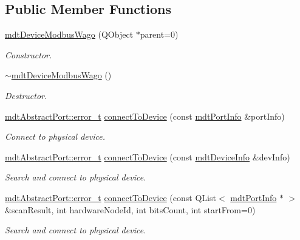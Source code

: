 \subsection*{Public Member Functions}
\begin{DoxyCompactItemize}
\item 
\hyperlink{classmdt_device_modbus_wago_a31abb03678a8afe2e6bf7c03e5e92726}{mdt\-Device\-Modbus\-Wago} (Q\-Object $\ast$parent=0)
\begin{DoxyCompactList}\small\item\em Constructor. \end{DoxyCompactList}\item 
\hyperlink{classmdt_device_modbus_wago_a8a13bfe3028d8c286d4233ea0ce0b2a8}{$\sim$mdt\-Device\-Modbus\-Wago} ()
\begin{DoxyCompactList}\small\item\em Destructor. \end{DoxyCompactList}\item 
\hyperlink{classmdt_abstract_port_ad4121bb930c95887e77f8bafa065a85e}{mdt\-Abstract\-Port\-::error\-\_\-t} \hyperlink{classmdt_device_modbus_wago_ac15c95cee8dec98609278d0e0ab2b3ce}{connect\-To\-Device} (const \hyperlink{classmdt_port_info}{mdt\-Port\-Info} \&port\-Info)
\begin{DoxyCompactList}\small\item\em Connect to physical device. \end{DoxyCompactList}\item 
\hyperlink{classmdt_abstract_port_ad4121bb930c95887e77f8bafa065a85e}{mdt\-Abstract\-Port\-::error\-\_\-t} \hyperlink{classmdt_device_modbus_wago_a025f0411a708a529054a0e3c0b6461cd}{connect\-To\-Device} (const \hyperlink{classmdt_device_info}{mdt\-Device\-Info} \&dev\-Info)
\begin{DoxyCompactList}\small\item\em Search and connect to physical device. \end{DoxyCompactList}\item 
\hyperlink{classmdt_abstract_port_ad4121bb930c95887e77f8bafa065a85e}{mdt\-Abstract\-Port\-::error\-\_\-t} \hyperlink{classmdt_device_modbus_wago_a12ad1f1ef34b16be5903d1d6232a7c6d}{connect\-To\-Device} (const Q\-List$<$ \hyperlink{classmdt_port_info}{mdt\-Port\-Info} $\ast$ $>$ \&scan\-Result, int hardware\-Node\-Id, int bits\-Count, int start\-From=0)
\begin{DoxyCompactList}\small\item\em Search and connect to physical device. \end{DoxyCompactList}\item 

\end{DoxyCompactItemize}
